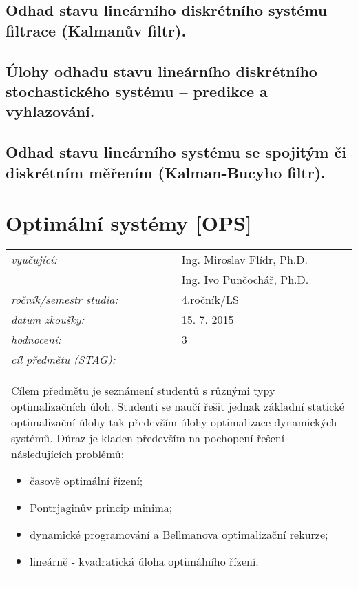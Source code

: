 \subsection{Odhad stavu lineárního diskrétního systému – filtrace (Kalmanův filtr).}

\subsection{Úlohy odhadu stavu lineárního diskrétního stochastického systému – predikce a vyhlazování.}

\subsection{Odhad stavu lineárního systému se spojitým či diskrétním měřením (Kalman-Bucyho filtr).}

\section{Optimální systémy [OPS]}

\begin{table}[H]
\centering
\begin{tabular}{p{4cm} p{12cm}}
\textit{vyučující:}             & Ing. Miroslav Flídr, Ph.D. \\
								 & Ing. Ivo Punčochář, Ph.D. \\
\textit{ročník/semestr studia:} & 4.ročník/LS \\
\textit{datum zkoušky:}         & 15. 7. 2015 \\
\textit{hodnocení:}             & 3 \\
\textit{cíl předmětu (STAG):}   & \\
\multicolumn{2}{p{16cm}}{Cílem předmětu je seznámení studentů s různými typy optimalizačních úloh. Studenti se naučí řešit jednak základní statické optimalizační úlohy tak především úlohy optimalizace dynamických systémů. Důraz je kladen především na pochopení řešení následujících problémů: 
\begin{itemize}
\item časově optimální řízení;
\item Pontrjaginův princip minima;
\item dynamické programování a Bellmanova optimalizační rekurze;
\item lineárně - kvadratická úloha optimálního řízení.
\end{itemize}}
\end{tabular}
\end{table}

